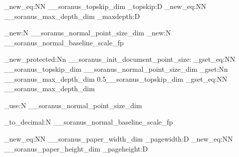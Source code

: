 %
%
%
% 
%


%

%

\cs_new_eq:NN \g__soranus_topskip_dim \tex_topskip:D
\cs_new_eq:NN \g__soranus_max_depth_dim \tex_maxdepth:D

\dim_new:N \g__soranus_normal_point_size_dim
\fp_new:N \g__soranus_normal_baseline_scale_fp


%

\cs_new_protected:Nn \__soranus_init_document_point_size:
  {
    \dim_gset_eq:NN \g__soranus_topskip_dim \g__soranus_normal_point_size_dim
    \dim_gset:Nn \g__soranus_max_depth_dim { 0.5\g__soranus_topskip_dim }
    \dim_gset_eq:NN \@maxdepth \g__soranus_max_depth_dim
  }


%

\NewDocumentCommand \NormalPointSize { }
  { \dim_use:N \g__soranus_normal_point_size_dim }

\NewDocumentCommand \NormalBaselineScale {}
  { \fp_to_decimal:N \g__soranus_normal_baseline_scale_fp }





%

%

\cs_new_eq:NN \g__soranus_paper_width_dim \tex_pagewidth:D
\cs_new_eq:NN \g__soranus_paper_height_dim \tex_pageheight:D

